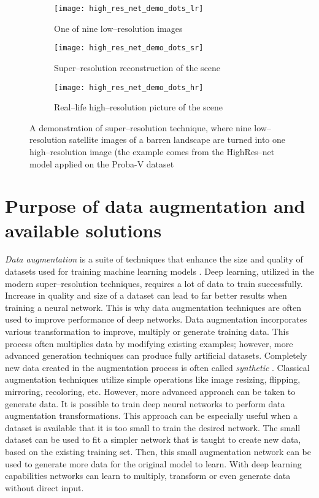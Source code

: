 \begin{figure}[p]
    \centering
    \begin{subfigure}[t]{0.32\textwidth}
        \centering
        \texttt{[image: high\_res\_net\_demo\_dots\_lr]}
        \caption{One of nine low--resolution images}
    \end{subfigure}
    \hfill
    \begin{subfigure}[t]{0.32\textwidth}
        \centering
        \texttt{[image: high\_res\_net\_demo\_dots\_sr]}
        \caption{Super--resolution reconstruction of the scene}
    \end{subfigure}
    \hfill
    \begin{subfigure}[t]{0.32\textwidth}
        \centering
        \texttt{[image: high\_res\_net\_demo\_dots\_hr]}
        \caption{Real--life high--resolution picture of the scene}
    \end{subfigure}
    \caption{A demonstration of super--resolution technique, where nine low--resolution satellite images of a barren landscape are turned into one  high--resolution image (the example comes from the HighRes--net model applied on the Proba-V dataset \cite{deudon-2020-highresnet}}
    \label{fig:super-res-dots-demo}
\end{figure}

\section{Purpose of data augmentation and available solutions}
\label{sec:augmentation-introduction}
\textit{Data augmentation} is a suite of techniques that enhance the size and quality of datasets used for training machine learning models \cite{perez-2017-augmentation}.
Deep learning, utilized in the modern super--resolution techniques, requires a
lot of data to train successfully.
Increase in quality and size of a dataset can lead to far better results when
training a neural network.
This is why data augmentation techniques are often used to improve performance
of deep networks.
Data augmentation incorporates various transformation to improve, multiply or
generate training data.
This process often multiplies data by modifying existing examples; however, more advanced generation techniques can produce fully artificial datasets.
Completely new data created in the augmentation process is often called \textit{synthetic} \cite{nikolenko-2021-synthetic}.
Classical augmentation techniques utilize simple operations like image resizing, flipping, mirroring, recoloring, etc.
However, more advanced approach can be taken to generate data.
It is possible to train deep neural networks to perform data augmentation
transformations.
This approach can be especially useful when a dataset is available that it is
too small to train the desired network.
The small dataset can be used to fit a simpler network that is taught to create new data, based on the existing training set.
Then, this small augmentation network can be used to generate more data for the
original model to learn.
With deep learning capabilities networks can learn to multiply, transform or
even generate data without direct input.

